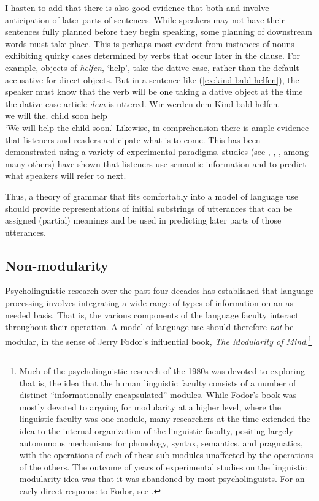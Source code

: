 \documentclass[output=paper
	        ,collection
	        ,collectionchapter
 	        ,biblatex
                ,babelshorthands
                ,newtxmath
                ,draftmode
                ,colorlinks, citecolor=brown
]{langscibook}
\begin{document}
I hasten to add that there is also good evidence that both  and  involve anticipation of later parts of sentences.  While speakers may not have their sentences fully planned before they begin speaking, some planning of downstream words must take place.  This is perhaps most evident from instances of nouns exhibiting quirky cases determined by verbs that occur later in the clause.  For example, objects of  \emph{helfen}, `help', take the dative case, rather than the default accusative for direct objects.  But in a sentence like (\ref{ex:kind-bald-helfen}), the speaker must know that the verb will be one taking a dative object at the time the dative case article \emph{dem} is uttered.
\ea\label{ex:kind-bald-helfen}
\gll Wir werden dem        Kind bald helfen.\\
     we will    the.\DAT{} child soon help\\\german
\glt `We will help the child soon.'
\z
Likewise, in comprehension there is ample evidence that listeners and readers anticipate what is to
come.  This has been demonstrated using a variety of experimental paradigms.  
studies (see \citealt{TanenhausEtal1995}, \citealt{AltmannKamide99}, \citealt{ArnoldEtal2007}, among
many others) have shown that listeners use semantic information and  to predict
what speakers will refer to next. 

Thus, a theory of grammar that fits comfortably into a model of language use should provide
representations of initial substrings of utterances that can be assigned (partial) meanings and be
used in predicting later parts of those utterances. 

\subsection{Non-modularity}

Psycholinguistic research over the past four decades has established that language processing involves integrating a wide range of types of information on an as-needed basis.  That is, the
various components of the language faculty interact throughout their operation.  A model of language use should therefore \emph{not} be modular, in the sense of Jerry Fodor's influential \citeyearpar{Fodor83a-u} book, \emph{The Modularity of Mind}.\footnote{Much of the psycholinguistic research of the 1980s was devoted to exploring  -- that is, the idea that the human linguistic faculty consists of a number of distinct ``informationally encapsulated'' modules.  While Fodor's book was mostly devoted to arguing for modularity at a higher level, where the linguistic faculty was one module, many researchers at the time extended the idea to the internal organization of the linguistic faculty, positing largely autonomous mechanisms for phonology, syntax, semantics, and pragmatics, with the operations of each of these sub-modules unaffected by the operations of the others. The outcome of years of experimental studies on the linguistic modularity idea was that it was abandoned by most psycholinguists. For an early direct response to Fodor, see \citet{MarslenTyler87}.}
\end{document}
